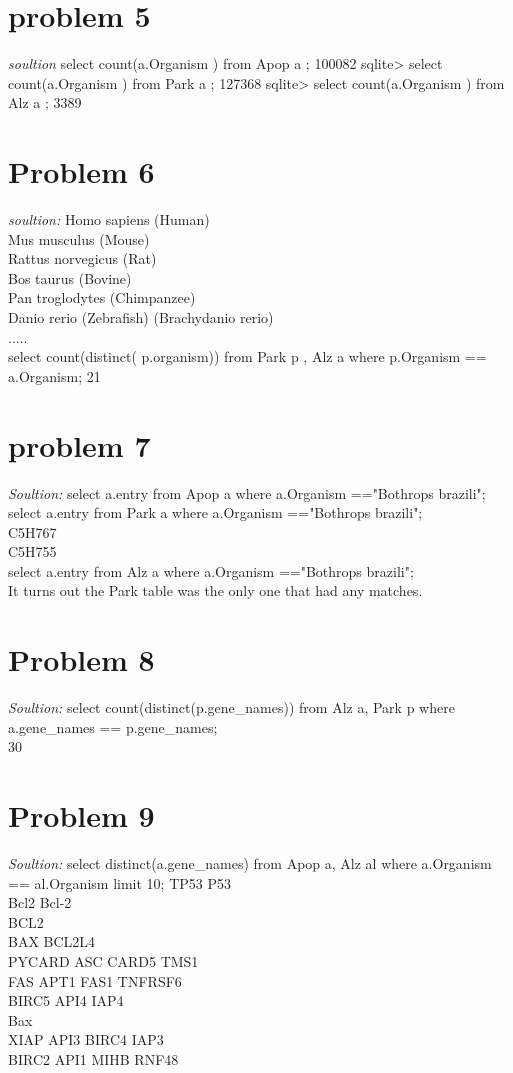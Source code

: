 \documentclass{article}
\begin{document}
\section*{problem 5}

\textit{soultion}
select count(a.Organism ) from Apop a ;
100082
sqlite> select count(a.Organism ) from Park a ;
127368
sqlite> select count(a.Organism ) from Alz a ;
3389

\section*{Problem 6}
\textit{soultion:}
Homo sapiens (Human)\\
Mus musculus (Mouse)\\
Rattus norvegicus (Rat)\\
Bos taurus (Bovine)\\
Pan troglodytes (Chimpanzee)\\
Danio rerio (Zebrafish) (Brachydanio rerio)\\
.....\\
 select count(distinct( p.organism)) from Park p , Alz a where p.Organism == a.Organism;
21

\section*{problem 7} 
\textit{Soultion:}
select a.entry from Apop a where a.Organism =="Bothrops brazili";\\
select a.entry from Park a where a.Organism =="Bothrops brazili";\\
C5H767\\
C5H755\\
select a.entry from Alz a where a.Organism =="Bothrops brazili";\\

It turns out the  Park table was the only one that had any matches. 
\section*{Problem 8}
 
\textit{Soultion:}
select count(distinct(p.gene\_names)) from Alz a, Park p where a.gene\_names == p.gene\_names; \\
30

\section*{Problem 9}
\textit{Soultion:}
select distinct(a.gene\_names) from Apop a, Alz al where a.Organism == al.Organism limit 10;
TP53 P53\\
Bcl2 Bcl-2\\
BCL2\\
BAX BCL2L4\\
PYCARD ASC CARD5 TMS1\\
FAS APT1 FAS1 TNFRSF6\\
BIRC5 API4 IAP4\\
Bax\\
XIAP API3 BIRC4 IAP3\\
BIRC2 API1 MIHB RNF48\\
\end{document}
